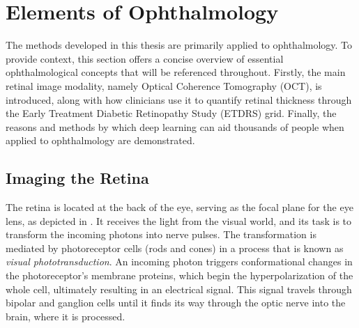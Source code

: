 
\section{Elements of Ophthalmology}
\label{sec:ophthalmology}

The methods developed in this thesis are primarily applied to ophthalmology. To provide context, this section offers a concise overview of essential ophthalmological concepts that will be referenced throughout. Firstly, the main retinal image modality, namely Optical Coherence Tomography (OCT), is introduced, along with how clinicians use it to quantify retinal thickness through the Early Treatment Diabetic Retinopathy Study (ETDRS) grid. Finally, the reasons and methods by which deep learning can aid thousands of people when applied to ophthalmology are demonstrated.

\subsection{Imaging the Retina}
The retina is located at the back of the eye, serving as the focal plane for the eye lens, as depicted in . It receives the light from the visual world, and its task is to transform the incoming photons into nerve pulses. The transformation is mediated by photoreceptor cells (rods and cones) in a process that is known as \textit{visual phototransduction}. An incoming photon triggers conformational changes in the photoreceptor's membrane proteins, which begin the hyperpolarization of the whole cell, ultimately resulting in an electrical signal. This signal travels through bipolar and ganglion cells until it finds its way through the optic nerve into the brain, where it is processed.


